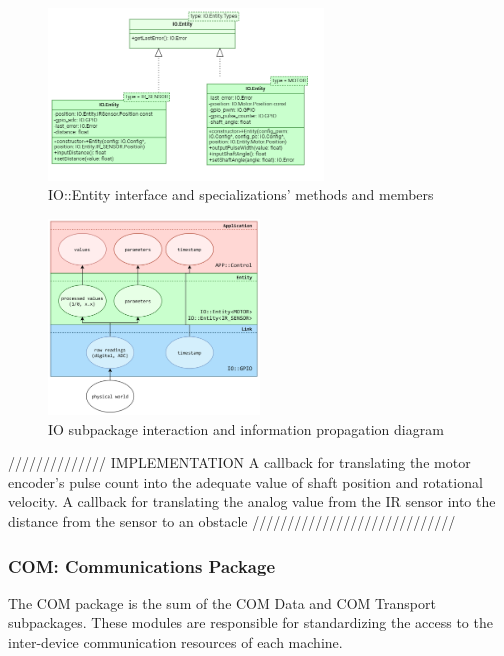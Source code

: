 \begin{figure}[H]
	\centering
	\includegraphics[width=0.65\textwidth]{./img/navig-class-entity.png}
	\caption {IO::Entity interface and specializations' methods and members}
	\label{fig:navig-class-entity}
	\end{figure}



\begin{figure}[H]
	\centering
	\includegraphics[width=0.5\textwidth]{./img/module-stack-io.png}
	\caption {IO subpackage interaction and information propagation diagram}
	\label{fig:navig-module-stack-io}
	\end{figure}

 


////////////// IMPLEMENTATION
A callback for translating the motor encoder's pulse count into the adequate value of shaft position and rotational velocity. 
A callback for translating the analog value from the IR sensor into the distance from the sensor to an obstacle
/////////////////////////////

\subsubsection{COM: Communications Package}

The COM package is the sum of the COM Data and COM Transport subpackages. These  modules are responsible for standardizing the access to the inter-device communication resources of each machine. 


